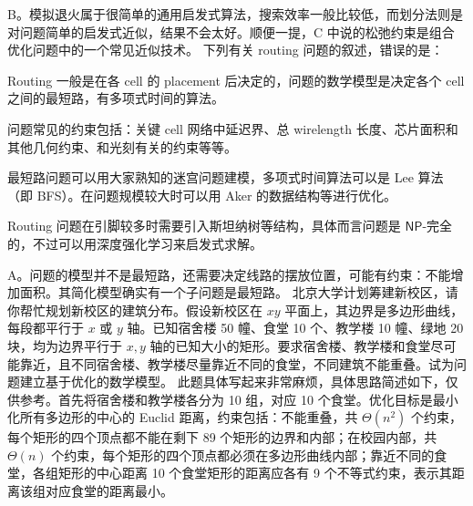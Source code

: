 \begin{problems}
\begin{choices}
        \end{choices}
        \sol B。模拟退火属于很简单的通用启发式算法，搜索效率一般比较低，而划分法则是对问题简单的启发式近似，结果不会太好。顺便一提，C 中说的松弛约束是组合优化问题中的一个常见近似技术。
        \pro 下列有关 routing 问题的叙述，错误的是：
        \begin{choices}
            \item Routing 一般是在各 cell 的 placement 后决定的，问题的数学模型是决定各个 cell 之间的最短路，有多项式时间的算法。
            \item 问题常见的约束包括：关键 cell 网络中延迟界、总 wirelength 长度、芯片面积和其他几何约束、和光刻有关的约束等等。
            \item 最短路问题可以用大家熟知的迷宫问题建模，多项式时间算法可以是 Lee 算法（即 BFS）。在问题规模较大时可以用 Aker 的数据结构等进行优化。
            \item Routing 问题在引脚较多时需要引入斯坦纳树等结构，具体而言问题是 $\mathsf{NP}$-完全的，不过可以用深度强化学习来启发式求解。
        \end{choices}
        \sol A。问题的模型并不是最短路，还需要决定线路的摆放位置，可能有约束：不能增加面积。其简化模型确实有一个子问题是最短路。
        \pro 北京大学计划筹建新校区，请你帮忙规划新校区的建筑分布。假设新校区在 $xy$ 平面上，其边界是多边形曲线，每段都平行于 $x$ 或 $y$ 轴。已知宿舍楼 50 幢、食堂 10 个、教学楼 10 幢、绿地 20 块，均为边界平行于 $x, y$ 轴的已知大小的矩形。要求宿舍楼、教学楼和食堂尽可能靠近，且不同宿舍楼、教学楼尽量靠近不同的食堂，不同建筑不能重叠。试为问题建立基于优化的数学模型。
        \sol 此题具体写起来非常麻烦，具体思路简述如下，仅供参考。首先将宿舍楼和教学楼各分为 10 组，对应 10 个食堂。优化目标是最小化所有多边形的中心的 Euclid 距离，约束包括：不能重叠，共 $\Theta(n^2)$ 个约束，每个矩形的四个顶点都不能在剩下 89 个矩形的边界和内部；在校园内部，共 $\Theta(n)$ 个约束，每个矩形的四个顶点都必须在多边形曲线内部；靠近不同的食堂，各组矩形的中心距离 10 个食堂矩形的距离应各有 9 个不等式约束，表示其距离该组对应食堂的距离最小。
    \end{problems}